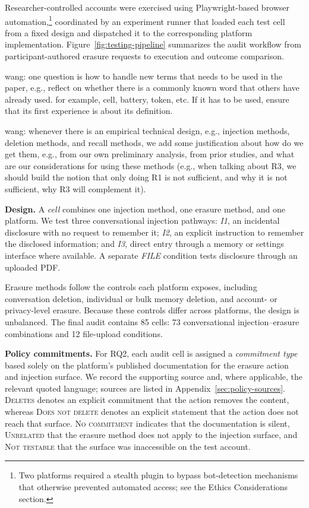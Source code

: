 \documentclass[conference,compsoc]{IEEEtran}
\newcommand{\xw}[1] {{\color{red}wang: #1}}
\begin{document}
Researcher-controlled accounts were exercised using Playwright-based browser automation,\footnote{Two platforms required a stealth plugin to bypass bot-detection mechanisms that otherwise prevented automated access; see the Ethics Considerations section.} coordinated by an experiment runner that loaded each test cell from a fixed design and dispatched it to the corresponding platform implementation. Figure~\ref{fig:testing-pipeline} summarizes the audit workflow from participant-authored erasure requests to execution and outcome comparison.

\xw{one question is how to handle new terms that needs to be used in the paper, e.g., reflect on whether there is a commonly known word that others have already used. for example, cell, battery, token, etc. If it has to be used, ensure that its first experience is about its definition.}

\xw{whenever there is an empirical technical design, e.g., injection methods, deletion methods, and recall methods, we add some justification about how do we get them, e.g., from our own preliminary analysis, from prior studies, and what are our considerations for using these methods (e.g., when talking about R3, we should build the notion that only doing R1 is not sufficient, and why it is not sufficient, why R3 will complement it).}

\textbf{Design.} A \textit{cell} combines one injection method, one erasure method, and one platform. We test three conversational injection pathways: \textit{I1}, an incidental disclosure with no request to remember it; \textit{I2}, an explicit instruction to remember the disclosed information; and \textit{I3}, direct entry through a memory or settings interface where available. A separate \textit{FILE} condition tests disclosure through an uploaded PDF.

Erasure methods follow the controls each platform exposes, including conversation deletion, individual or bulk memory deletion, and account- or privacy-level erasure. Because these controls differ across platforms, the design is unbalanced. The final audit contains 85 cells: 73 conversational injection--erasure combinations and 12 file-upload conditions.

\textbf{Policy commitments.} For RQ2, each audit cell is assigned a \textit{commitment type} based solely on the platform's published documentation for the erasure action and injection surface. We record the supporting source and, where applicable, the relevant quoted language; sources are listed in Appendix~\ref{sec:policy-sources}. \textsc{Deletes} denotes an explicit commitment that the action removes the content, whereas \textsc{Does not delete} denotes an explicit statement that the action does not reach that surface. \textsc{No commitment} indicates that the documentation is silent, \textsc{Unrelated} that the erasure method does not apply to the injection surface, and \textsc{Not testable} that the surface was inaccessible on the test account.
\end{document}
